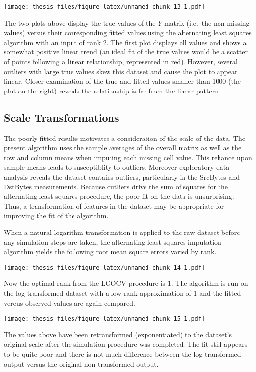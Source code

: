 \documentclass[12pt,twoside]{dukestatscithesis}
\theoremstyle{definition}
\theoremstyle{definition}
\theoremstyle{definition}
\theoremstyle{remark}
\begin{document}
\texttt{[image: thesis\_files/figure-latex/unnamed-chunk-13-1.pdf]}

The two plots above display the true values of the \(Y\) matrix
(i.e.~the non-missing values) versus their corresponding fitted values
using the alternating least squares algorithm with an input of rank 2.
The first plot displays all values and shows a somewhat positive linear
trend (an ideal fit of the true values would be a scatter of points
following a linear relationship, represented in red). However, several
outliers with large true values skew this dataset and cause the plot to
appear linear. Closer examination of the true and fitted values smaller
than 1000 (the plot on the right) reveals the relationship is far from
the linear pattern.

\subsection{Scale Transformations}\label{scale-transformations}

The poorly fitted results motivates a consideration of the scale of the
data. The present algorithm uses the sample averages of the overall
matrix as well as the row and column means when imputing each missing
cell value. This reliance upon sample means leads to susceptiblity to
outliers. Moreover exploratory data analysis reveals the dataset
contains outliers, particularly in the SrcBytes and DstBytes
measurements. Because outliers drive the sum of squares for the
alternating least squares procedure, the poor fit on the data is
unsurprising. Thus, a transformation of features in the dataset may be
appropriate for improving the fit of the algorithm.

When a natural logarithm transformation is applied to the raw dataset
before any simulation steps are taken, the alternating least squares
imputation algorithm yields the following root mean square errors varied
by rank.

\texttt{[image: thesis\_files/figure-latex/unnamed-chunk-14-1.pdf]}

Now the optimal rank from the LOOCV procedure is 1. The algorithm is run
on the log transformed dataset with a low rank approximation of 1 and
the fitted vereus observed values are again compared.

\texttt{[image: thesis\_files/figure-latex/unnamed-chunk-15-1.pdf]}

The values above have been retransformed (exponentiated) to the
dataset's original scale after the simulation procedure was completed.
The fit still appears to be quite poor and there is not much difference
between the log transformed output versus the original non-transformed
output.
\end{document}
